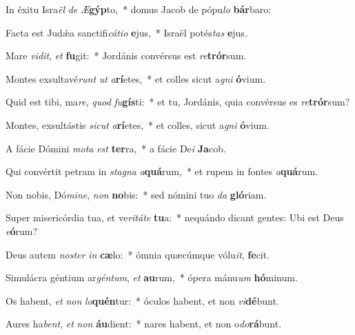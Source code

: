 \item In éxitu Isra\textit{ël} \textit{de} \textit{Æ}\textbf{gýp}to,~* domus Jacob de pópu\textit{lo} \textbf{bár}baro:

\item Facta est Judǽa sanctifi\textit{cátio} \textbf{e}jus,~* Israël potés\textit{tas} \textbf{e}jus.

\item Mare \textit{vidit}, \textit{et} \textbf{fu}git:~* Jordánis convérsus est \textit{re}\textbf{trór}sum.

\item Montes exsultavé\textit{runt} \textit{ut} \textit{a}\textbf{rí}etes,~* et colles sicut a\textit{gni} \textbf{ó}vium.

\item Quid est tibi, ma\textit{re}, \textit{quod} \textit{fu}\textbf{gís}ti:~* et tu, Jordánis, quia convérsus es \textit{re}\textbf{trór}sum?

\item Montes, exsultástis \textit{sicut} \textit{a}\textbf{rí}etes,~* et colles, sicut a\textit{gni} \textbf{ó}vium.

\item A fácie Dómini \textit{mota} \textit{est} \textbf{ter}ra,~* a fácie De\textit{i} \textbf{Ja}cob.

\item Qui convértit petram in \textit{stagna} \textit{a}\textbf{quá}rum,~* et rupem in fontes \textit{a}\textbf{quá}rum.

\item Non nobis, Dó\textit{mine}, \textit{non} \textbf{no}bis:~* sed nómini tuo \textit{da} \textbf{gló}riam.

\item Super misericórdia tua, et ve\textit{ritáte} \textbf{tu}a:~* nequándo dicant gentes: Ubi est Deus \textit{e}\textbf{ó}rum?

\item Deus autem \textit{noster} \textit{in} \textbf{cæ}lo:~* ómnia quæcúmque vólu\textit{it}, \textbf{fe}cit.

\item Simulácra géntium ar\textit{géntum}, \textit{et} \textbf{au}rum,~* ópera mánu\textit{um} \textbf{hó}minum.

\item Os habent, \textit{et} \textit{non} \textit{lo}\textbf{quén}tur:~* óculos habent, et non \textit{vi}\textbf{dé}bunt.

\item Aures ha\textit{bent}, \textit{et} \textit{non} \textbf{áu}dient:~* nares habent, et non o\textit{do}\textbf{rá}bunt.

